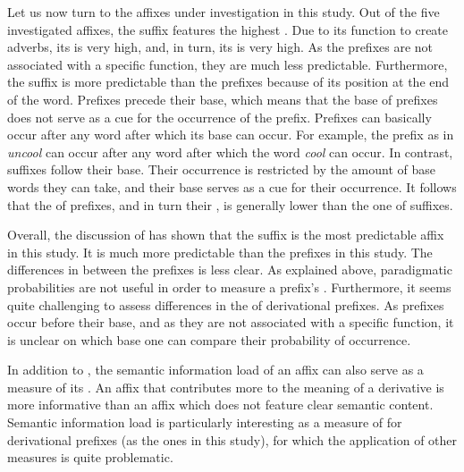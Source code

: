   
Let us now turn to the affixes under investigation in this study. Out of the five investigated affixes, the suffix  features the highest . Due to its function to create adverbs, its  is very high, and, in turn, its  is very high. As the prefixes are not associated with a specific function, they are much less predictable.  
Furthermore, the suffix  is more predictable than the prefixes because of its position at the end of the word. 
 Prefixes precede their base, which means that the base of prefixes does not serve as a cue for the occurrence of the prefix. Prefixes can basically occur after any word after which its base can occur. 
 For example, the prefix  as in \textit{uncool} can occur after any word after which the word \textit{cool} can occur. 
 In contrast, suffixes follow their base. Their occurrence is restricted by the amount of base words they can take,  and their base serves as a cue for their occurrence.
 It follows that the  of prefixes, and in turn their , is generally lower than the one of suffixes. 
 
Overall, the discussion of  has shown that the suffix  is the most predictable affix in this study. It is much more predictable than the prefixes in this study. The differences in  between the prefixes is less clear. As explained above, paradigmatic probabilities are not useful in order to measure a prefix's . Furthermore, it seems quite challenging to assess differences in the  of derivational prefixes. As prefixes occur before their base, and as they are not associated with a specific function, it is unclear on which base one can compare their probability of occurrence.\largerpage





In addition to , the semantic information load of an affix can also serve as a measure of its . An affix that contributes more to the meaning of a derivative is more informative than an affix which does not feature clear semantic content. Semantic information load is particularly interesting as a measure of  for derivational prefixes (as the ones in this study), for which the application of other  measures is quite problematic. 

